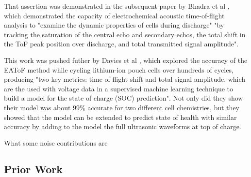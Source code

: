 That assertion was demonstrated in the subsequent paper by Bhadra et al  \cite{ANODE-CHAR}, which demonstrated the capacity of electrochemical acoustic time-of-flight analysis to "examine the dynamic properties of cells during discharge" "by tracking the saturation of the central echo and secondary echos, the total shift in the ToF peak position over discharge, and total transmitted signal amplitude".

This work was pushed futher by Davies et al  \cite{SOC-SOH-EST}, which explored the accuracy of the EAToF method while cycling lithium-ion pouch cells over hundreds of cycles, producing "two key metrics: time of flight shift and total signal amplitude, which are the used with voltage data in a supervised machine learning technique to build a model for the state of charge (SOC) prediction". Not only did they show their model was about $99\%$ accurate for two different cell chemistries, but they showed that the model can be extended to predict state of health with similar accuracy by adding to the model the full ultrasonic waveforms at top of charge.



What some noise contributions are

\subsection{Prior Work}